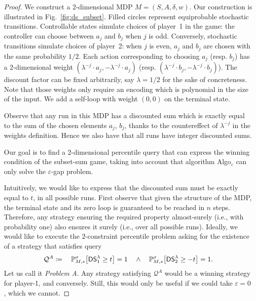 \documentclass{llncs}
\newcommand{\states}{\ensuremath{S} }
\newcommand{\weight}{\ensuremath{w} }
\newcommand{\markovProcess}{\ensuremath{{M} }}
\newcommand{\strat}{\ensuremath{\sigma} }
\newcommand*{\pr}{\mathbb{P}}
\newcommand{\discSum}[1]{\ensuremath{{\sf DS}^{#1}} }
\newcommand{\discount}{\ensuremath{\lambda} }
\newcommand{\query}{\ensuremath{\mathcal{Q}} }
\begin{document}
\begin{proof}
We construct a 2-dimensional MDP $\markovProcess = (\states, A, \delta, \weight)$. Our construction is illustrated in Fig.~\ref{fig:ds_subset}. Filled circles represent equiprobable stochastic transitions. Controllable states simulate choices of player~1 in the game: the controller can choose between $a_{j}$ and $b_{j}$ when $j$ is odd. Conversely, stochastic transitions simulate choices of player~2: when $j$ is even, $a_{j}$ and $b_{j}$ are chosen with the same probability $1/2$. Each action corresponding to choosing $a_{j}$ (resp. $b_{j}$) has a 2-dimensional weight $(\discount^{-j} \cdot a_{j}, -\discount^{-j} \cdot a_{j})$ (resp. $(\discount^{-j} \cdot b_{j}, -\discount^{-j} \cdot b_{j})$). The discount factor can be fixed arbitrarily, say $\discount = 1/2$ for the sake of concreteness. Note that those weights only require an encoding which is polynomial in the size of the input. We add a self-loop with weight $(0, 0)$ on the terminal state.

Observe that any run in this MDP has a discounted sum which is exactly equal to the sum of the chosen elements $a_{j}$, $b_{j}$, thanks to the countereffect of $\discount^{-j}$ in the weights definition. Hence we also have that all runs have integer discounted sums. 

Our goal is to find a 2-dimensional percentile query that can express the winning condition of the subset-sum game, taking into account that algorithm \textsf{Algo}$_{\varepsilon}$ can only solve the $\varepsilon$-gap problem. 

Intuitively, we would like to express that the discounted sum must be exactly equal to $t$, in all possible runs. First observe that given the structure of the MDP, the terminal state and its zero loop is guaranteed to be reached in $n$ steps. Therefore, any strategy ensuring the required property almost-surely (i.e., with probability one) also ensures it surely (i.e., over all possible runs). Ideally, we would like to execute the $2$-constraint percentile problem asking for the existence of a strategy that satisfies query
\begin{equation*}
\query^{A} \coloneqq \quad \pr_{M,s}^\strat \big[\discSum{\discount}_{1} \geq t\big] = 1\quad \wedge \quad \pr_{M,s}^\strat \big[\discSum{\discount}_{2} \geq -t\big] = 1.
\end{equation*}
Let us call it \textit{Problem A}. Any strategy satisfying $\query^{A}$ would be a winning strategy for player-1, and conversely. Still, this would only be useful if we could take $\varepsilon = 0$, which we cannot.


\end{proof}
\end{document}
